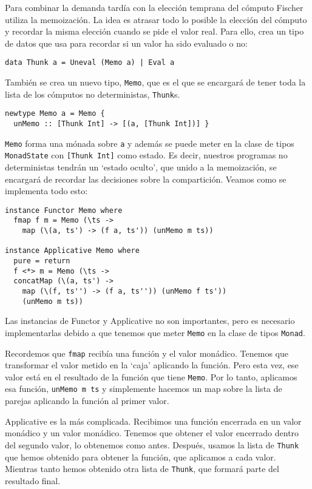 \documentclass[class=article, crop=false]{standalone}
\begin{document}
Para combinar la demanda tardía con la elección temprana del cómputo Fischer utiliza la
memoización. La idea es atrasar todo lo posible la elección del cómputo y recordar la misma
elección cuando se pide el valor real. Para ello, crea un tipo de datos que usa para recordar
si un valor ha sido evaluado o no:

\begin{verbatim} 
data Thunk a = Uneval (Memo a) | Eval a
\end{verbatim}

También se crea un nuevo tipo, \verb`Memo`, que es el que se encargará de tener toda la lista
de los cómputos no deterministas, \verb`Thunk`s.

\begin{verbatim} 
newtype Memo a = Memo {
  unMemo :: [Thunk Int] -> [(a, [Thunk Int])] }
\end{verbatim}

\verb`Memo` forma una mónada sobre \verb`a` y además se puede meter en la clase de tipos
\verb`MonadState` con \verb`[Thunk Int]` como estado. Es decir, nuestros programas no
deterministas tendrán un `estado oculto', que unido a la memoización, se encargará de
recordar las decisiones sobre la compartición. Veamos como se implementa todo esto:

\begin{verbatim}
instance Functor Memo where
  fmap f m = Memo (\ts ->
    map (\(a, ts') -> (f a, ts')) (unMemo m ts))

instance Applicative Memo where
  pure = return
  f <*> m = Memo (\ts ->
  concatMap (\(a, ts') ->
    map (\(f, ts'') -> (f a, ts'')) (unMemo f ts'))
    (unMemo m ts))
\end{verbatim}

Las instancias de Functor y Applicative no son importantes, pero es necesario implementarlas
debido a que tenemos que meter \verb`Memo` en la clase de tipos \verb`Monad`.

Recordemos que \verb`fmap` recibía una función y el valor monádico. Tenemos que transformar
el valor metido en la `caja' aplicando la función. Pero esta vez, ese valor está en el
resultado de la función que tiene \verb`Memo`. Por lo tanto, aplicamos esa función,
\verb`unMemo m ts` y simplemente hacemos un map sobre la lista de parejas aplicando la
función al primer valor.

Applicative es la más complicada. Recibimos una función encerrada en un valor monádico y un
valor monádico. Tenemos que obtener el valor encerrado dentro del segundo valor, lo obtenemos
como antes. Después, usamos la lista de \verb`Thunk` que hemos obtenido para obtener la
función, que aplicamos a cada valor. Mientras tanto hemos obtenido otra lista de
\verb`Thunk`, que formará parte del resultado final.
\end{document}

